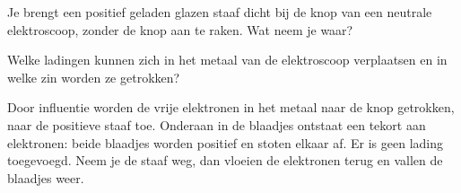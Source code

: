 \documentclass{ximera}
\begin{document}
\begin{question}
    Je brengt een positief geladen glazen staaf dicht bij de knop van een neutrale elektroscoop, zonder de knop aan te raken. Wat neem je waar?

    \begin{multipleChoice}
    \end{multipleChoice}

    \begin{hint}
        Welke ladingen kunnen zich in het metaal van de elektroscoop verplaatsen en in welke zin worden ze getrokken?
    \end{hint}

    \begin{solution}\nl
        Door influentie worden de vrije elektronen in het metaal naar de knop getrokken, naar de positieve staaf toe. Onderaan in de blaadjes ontstaat een tekort aan elektronen: beide blaadjes worden positief en stoten elkaar af. Er is geen lading toegevoegd. Neem je de staaf weg, dan vloeien de elektronen terug en vallen de blaadjes weer.
    \end{solution}
\end{question}
\end{document}
